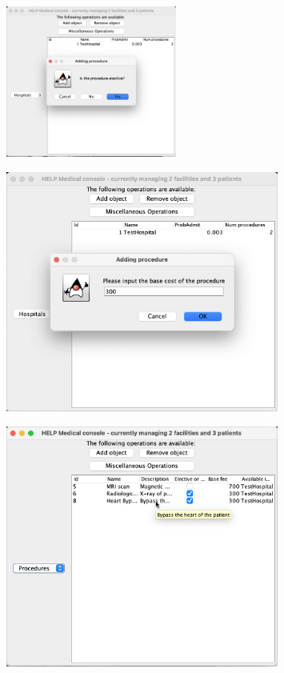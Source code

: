 \documentclass{article}
\begin{document}
\begin{figure}
  \begin{center}
    \includegraphics[width=0.5\textwidth]{./figures/Add/Procedure_5.png}
  \end{center}
\end{figure}

\begin{figure}
  \begin{center}
    \includegraphics[width=0.8\textwidth]{./figures/Add/Procedure_6.png}
  \end{center}
\end{figure}

\begin{figure}
  \begin{center}
    \includegraphics[width=0.8\textwidth]{./figures/Add/Procedure_7.png}
  \end{center}
\end{figure}
\end{document}
